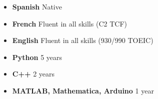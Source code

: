 %
%
%

\begin{multicols}{2}
\begin{itemize}
    \item \textbf{Spanish} Native
    \item \textbf{French} Fluent in all skills (C2 TCF)
    \item \textbf{English} Fluent in all skills (930/990 TOEIC)
\end{itemize}

\columnbreak

\begin{itemize}
    \item \textbf{Python} 5 years
    \item \textbf{C++} 2 years
    \item \textbf{MATLAB, Mathematica, Arduino} 1 year
\end{itemize}
\end{multicols}
\vspace{-1.5em}
